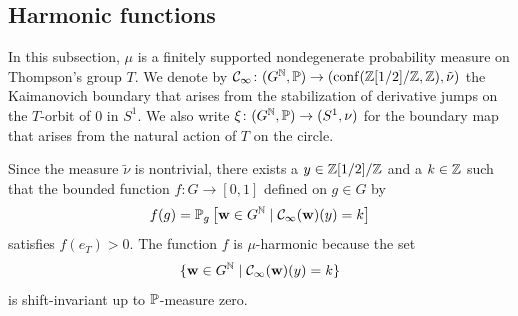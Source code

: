 \subsection{Harmonic functions}
In this subsection, $\mu$ is a finitely supported nondegenerate probability measure on Thompson's group $T$. We denote by $\cC_\infty \colon (G^\N, \P) \to (\mathrm{conf}(\Z[1/2]/\Z,\Z), \tilde{\nu})$ the Kaimanovich boundary that arises from the stabilization of derivative jumps on the $T$-orbit of 0 in $S^1$. %
We also write $\xi \colon (G^\N, \P) \to (S^1, \nu)$ for the boundary map that arises from the natural action of $T$ on the circle.

Since the measure $\tilde{\nu}$ is nontrivial, there exists a $y \in \Z[1/2]/\Z$ and a $k \in \Z$ such that the bounded function $f \colon G \to [0,1]$ defined on $g \in G$ by
\[
f(g) = \P_g\left[ \mathbf{w} \in G^\N \mid \cC_\infty(\mathbf{w})(y) = k \right]
\]satisfies $f(e_T) > 0$.
The function $f$ is $\mu$-harmonic because the set \[\{\mathbf{w} \in G^\N  \mid \cC_\infty(\mathbf{w})(y) = k\}\] is shift-invariant up to $\P$-measure zero.

